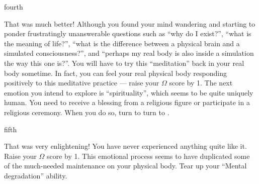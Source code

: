 \documentclass[notebook]{guildcamp1}
\begin{document}
\begin{page}{fourth}

That was much better! Although you found your mind wandering and starting to ponder frustratingly unanswerable questions such as ``why do I exist?'', ``what is the meaning of life?'', ``what is the difference between a physical brain and a simulated consciousness?'', and ``perhaps my real body is also inside a simulation the way this one is?''. You will have to try this ``meditation'' back in your real body sometime. In fact, you can feel your real physical body responding positively to this meditative practice --- raise your $\Omega$ score by 1. The next emotion you intend to explore is ``spirituality'', which seems to be quite uniquely human. You need to receive a blessing from a religious figure or participate in a religious ceremony. When you do so, turn to turn to .

\end{page}

\begin{page}{fifth}

That was very enlightening! You have never experienced anything quite like it. Raise your $\Omega$ score by 1. This emotional process seems to have duplicated some of the much-needed maintenance on your physical body. Tear up your ``Mental degradation'' ability.

\end{page}

\endnotebook
\end{document}
